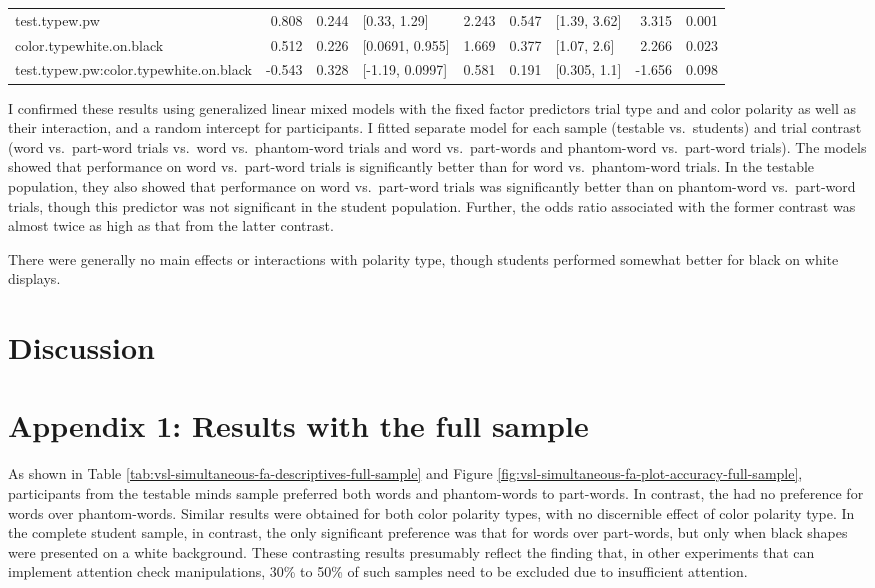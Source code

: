 \documentclass[
]{article}
\begin{document}
\begin{table}[!h]
{\begin{tabular}[t]{lrrlrrlrr}
\hspace{1em}test.typew.pw & 0.808 & 0.244 & {}[0.33, 1.29] & 2.243 & 0.547 & {}[1.39, 3.62] & 3.315 & 0.001\\
\hspace{1em}color.typewhite.on.black & 0.512 & 0.226 & {}[0.0691, 0.955] & 1.669 & 0.377 & {}[1.07, 2.6] & 2.266 & 0.023\\
\hspace{1em}test.typew.pw:color.typewhite.on.black & -0.543 & 0.328 & {}[-1.19, 0.0997] & 0.581 & 0.191 & {}[0.305, 1.1] & -1.656 & 0.098\\
\bottomrule
\end{tabular}}
\end{table}

I confirmed these results using generalized linear mixed models with the
fixed factor predictors trial type and and color polarity as well as
their interaction, and a random intercept for participants. I fitted
separate model for each sample (testable vs.~students) and trial
contrast (word vs.~part-word trials vs.~word vs.~phantom-word trials and
word vs.~part-words and phantom-word vs.~part-word trials). The models
showed that performance on word vs.~part-word trials is significantly
better than for word vs.~phantom-word trials. In the testable
population, they also showed that performance on word vs.~part-word
trials was significantly better than on phantom-word vs.~part-word
trials, though this predictor was not significant in the student
population. Further, the odds ratio associated with the former contrast
was almost twice as high as that from the latter contrast.

There were generally no main effects or interactions with polarity type,
though students performed somewhat better for black on white displays.

\section{Discussion}\label{discussion}

\clearpage

\section{Appendix 1: Results with the full
sample}\label{appendix-1-results-with-the-full-sample}

As shown in Table \ref{tab:vsl-simultaneous-fa-descriptives-full-sample}
and Figure \ref{fig:vsl-simultaneous-fa-plot-accuracy-full-sample},
participants from the testable minds sample preferred both words and
phantom-words to part-words. In contrast, the had no preference for
words over phantom-words. Similar results were obtained for both color
polarity types, with no discernible effect of color polarity type. In
the complete student sample, in contrast, the only significant
preference was that for words over part-words, but only when black
shapes were presented on a white background. These contrasting results
presumably reflect the finding that, in other experiments that can
implement attention check manipulations, 30\% to 50\% of such samples
need to be excluded due to insufficient attention.
\end{document}
